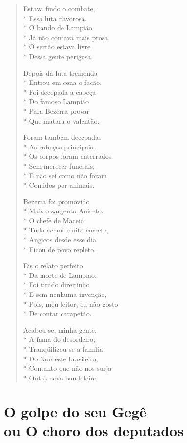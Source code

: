 \begin{verse}
Estava findo o combate,\\*
Essa luta pavorosa.\\*
O bando de Lampião\\*
Já não contava mais prosa,\\*
O sertão estava livre\\*
Dessa gente perigosa.

Depois da luta tremenda\\*
Entrou em cena o facão.\\*
Foi decepada a cabeça \\*
Do famoso Lampião\\*
Para Bezerra provar\\*
Que matara o valentão.

Foram também decepadas\\*
As cabeças principais.\\*
Os corpos foram enterrados\\*
Sem merecer funerais,\\*
E não sei como não foram\\*
Comidos por animais.

Bezerra foi promovido\\*
Mais o sargento Aniceto.\\*
O chefe de Maceió\\*
Tudo achou muito correto,\\*
Angicos desde esse dia\\*
Ficou de povo repleto.

Eis o relato perfeito\\*
Da morte de Lampião.\\*
Foi tirado direitinho\\*
E sem nenhuma invenção,\\*
Pois, meu leitor, eu não gosto\\*
De contar carapetão.

Acabou-se, minha gente,\\*
A fama do desordeiro;\\*
Tranqüilizou-se a família\\*
Do Nordeste brasileiro,\\*
Contanto que não nos surja\\*
Outro novo bandoleiro.
\end{verse}

\chapter[O golpe do seu Gegê ou O choro dos deputados]{O golpe do seu Gegê\\ ou O choro dos deputados}

